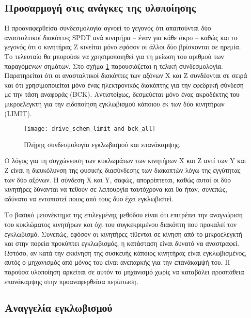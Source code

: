 \subsection{Προσαρμογή στις ανάγκες της υλοποίησης}

Η προαναφερθείσα συνδεσμολογία αγνοεί το γεγονός ότι απαιτούνται δύο
ανασταλτικοί διακόπτες SPDT ανά κινητήρα -- έναν για κάθε άκρο -- καθώς και το
γεγονός ότι ο κινητήρας Z κινείται μόνο εφόσον οι άλλοι δύο βρίσκονται σε
ηρεμία. Το τελευταίο θα μπορούσε να χρησιμοποιηθεί για τη μείωση του αριθμού των
παραγόμενων σημάτων. Στο σχήμα \ref{fig:motor:limit_switch_final} παρουσιάζεται
η τελική συνδεσμολογία. Παρατηρείται ότι οι ανασταλτικοί διακόπτες των αξόνων X
και Z συνδέονται σε σειρά και ότι χρησιμοποιείται μόνο ένας ηλεκτρονικός
διακόπτης για την εφεδρική σύνδεση με την τάση αναφοράς (BCK).
Αντιστοίχως, δεσμεύεται μόνο ένας ακροδέκτης του μικροελεγκτή για την ειδοποίηση
εγκλωβισμού κάποιου εκ των δύο κινητήρων (LIMIT).

\begin{figure}
    \caption{Πλήρης συνδεσμολογία εγκλωβισμού και επανάκαμψης.
    \label{fig:motor:limit_switch_final}}
    \begin{center}
    \texttt{[image: drive\_schem\_limit-and-bck\_all]}
    \end{center}
\end{figure}

Ο λόγος για τη συγχώνευση των κυκλωμάτων των κινητήρων X και Z αντί των Y και Z
είναι η διευκόλυνση της φυσικής διασύνδεσης των διακοπτών λόγω της εγγύτητας των
δύο αξόνων.
Η σύνδεση X και Y, σαφώς, απορρίπτεται, καθώς αυτοί οι δύο κινητήρες δύνανται να
τεθούν σε λειτουργία ταυτόχρονα και θα ήταν, συνεπώς, αδύνατο να εντοπιστεί
ποιος από τους δύο έχει εγκλωβιστεί.

Το βασικό μειονέκτημα της επιλεγμένης μεθόδου είναι ότι επιτρέπει την αναγνώριση
του κυκλώματος κινητήρων και όχι του συγκεκριμένου διακόπτη που προκαλεί τον
εγκλωβισμό. Συνεπώς, εφόσον οι κινητήρες τίθενται σε κίνηση από το μικροελεγκτή
και στην πορεία προκύπτει εγκλωβισμός, η κατάσταση είναι δυνατό να αναστραφεί.
Ωστόσο, αν κατά την εκκίνηση της συσκευής κάποιος κινητήρας είναι εγκλωβισμένος,
αυτός ο μηχανισμός από μόνος του είναι ανεπαρκής για την επανάκαμψή του. Η
παρούσα υλοποίηση αρκείται σε αυτόν το μηχανισμό χωρίς να καταβάλει προσπάθεια
επανάκαμψης στην προαναφερθείσα περίπτωση.

\subsection{Αναγγελία εγκλωβισμού}
\label{subsec:motor:limit-pin-change}

